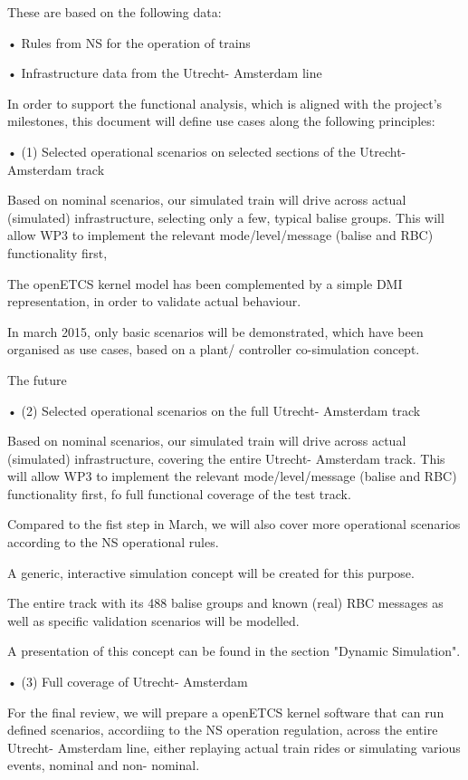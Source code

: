 These are based on the following data:

•  Rules from NS for the operation of trains

•  Infrastructure data from the Utrecht- Amsterdam line

In order to support the functional analysis, which is aligned with the project's milestones, this document will define use cases along the following principles:

•  (1) Selected operational scenarios on selected sections of the Utrecht- Amsterdam track

Based on nominal scenarios, our simulated train will drive across actual (simulated) infrastructure, selecting only a few, typical balise groups.
This will allow WP3 to implement the relevant mode/level/message (balise and RBC) functionality first,

The openETCS kernel model has been complemented by a simple DMI representation, in order to validate actual behaviour. 

In march 2015, only basic scenarios will be demonstrated, which have been organised as use cases, based on a plant/ controller co-simulation concept.

The future 


•  (2) Selected operational scenarios on the full Utrecht- Amsterdam track

Based on nominal scenarios, our simulated train will drive across actual (simulated) infrastructure, covering the entire Utrecht- Amsterdam track.
This will allow WP3 to implement the relevant mode/level/message (balise and RBC) functionality first, fo full functional coverage of the test track.

Compared to the fist step in March, we will also cover more operational scenarios according to the NS operational rules.

A generic, interactive simulation concept will be created for this purpose. 

The entire track with its 488 balise groups and known (real) RBC messages as well as specific validation scenarios will be modelled.

A presentation of this concept can be found in the section "Dynamic Simulation".

•  (3) Full coverage of Utrecht- Amsterdam

For the final review, we will prepare a openETCS kernel software that can run defined scenarios, accordiing to the NS operation regulation, across the entire Utrecht- Amsterdam line, either replaying actual train rides or simulating various events, nominal and non- nominal.

